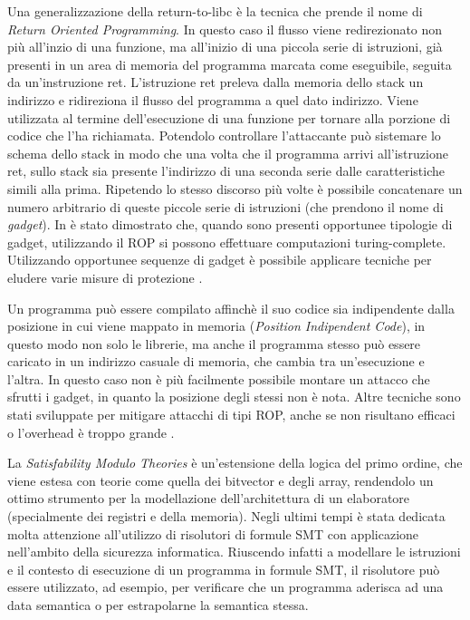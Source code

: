 Una generalizzazione della return-to-libc è la tecnica che prende il
nome di \emph{Return Oriented
  Programming}\cite{Shacham-2007,Roemer-2012}. In questo caso il
flusso viene redirezionato non più all'inzio di una funzione, ma
all'inizio di una piccola serie di istruzioni, già presenti in un area
di memoria del programma marcata come eseguibile, seguita da
un'instruzione ret. L'istruzione ret preleva dalla memoria dello stack
un indirizzo e ridireziona il flusso del programma a quel dato
indirizzo. Viene utilizzata al termine dell'esecuzione di una funzione
per tornare alla porzione di codice che l'ha richiamata. Potendolo
controllare l'attaccante può sistemare lo schema dello stack in modo
che una volta che il programma arrivi all'istruzione ret, sullo stack
sia presente l'indirizzo di una seconda serie dalle caratteristiche
simili alla prima. Ripetendo lo stesso discorso più volte è possibile
concatenare un numero arbitrario di queste piccole serie di istruzioni
(che prendono il nome di \emph{gadget}). In \cite{roemer-12} è stato
dimostrato che, quando sono presenti opportunee tipologie di gadget,
utilizzando il ROP si possono effettuare computazioni
turing-complete. Utilizzando opportunee sequenze di gadget è possibile
applicare tecniche per eludere varie misure di protezione
\cite{roglia:2009}.

Un programma può essere compilato affinchè il suo codice sia
indipendente dalla posizione in cui viene mappato in memoria
(\emph{Position Indipendent Code}), in questo modo non solo le
librerie, ma anche il programma stesso può essere caricato in un
indirizzo casuale di memoria, che cambia tra un'esecuzione e
l'altra. In questo caso non è più facilmente possibile montare un
attacco che sfrutti i gadget, in quanto la posizione degli stessi non
è nota. Altre tecniche sono stati sviluppate per mitigare attacchi di
tipi ROP, anche se non risultano efficaci o l'overhead è troppo grande
\cite{Davi-2014}.

La \emph{Satisfability Modulo Theories}\cite{Barrett-14} è
un'estensione della logica del primo ordine, che viene estesa con
teorie come quella dei bitvector e degli array, rendendolo un ottimo
strumento per la modellazione dell'architettura di un elaboratore
(specialmente dei registri e della memoria). Negli ultimi tempi è
stata dedicata molta attenzione all'utilizzo di risolutori di formule
SMT con applicazione nell'ambito della sicurezza\cite{}
informatica. Riuscendo infatti a modellare le istruzioni e il contesto
di esecuzione di un programma in formule SMT, il risolutore può essere
utilizzato, ad esempio, per verificare che un programma aderisca ad
una data semantica o per estrapolarne la semantica stessa.


